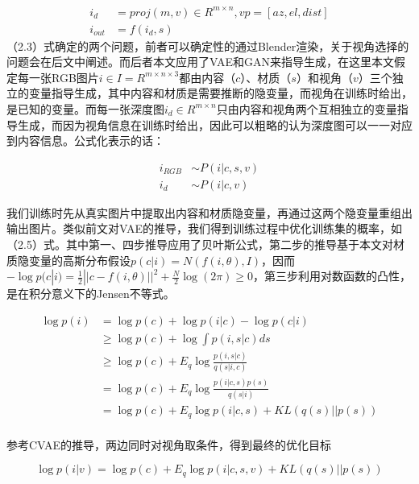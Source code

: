 \documentclass[UTF8,openany,AutoFakeBold,AutoFakeSlant,cs4size]{ctexbook}
\begin{document}
\begin{equation}
	\begin{aligned}
		i_{d} &= proj(m, v) \in R^{m \times n}, vp = [az, el, dist] \\
		i_{out} &= f(i_{d}, s)
	\end{aligned}
\end{equation}
（2.3）式确定的两个问题，前者可以确定性的通过Blender渲染，关于视角选择的问题会在后文中阐述。而后者本文应用了VAE和GAN来指导生成，在这里本文假定每一张RGB图片$i \in I = R^{m \times n \times 3}$都由内容（$c$）、材质（$s$）和视角（$v$）三个独立的变量指导生成，其中内容和材质是需要推断的隐变量，而视角在训练时给出，是已知的变量。而每一张深度图$i_{d} \in R^{m \times n}$只由内容和视角两个互相独立的变量指导生成，而因为视角信息在训练时给出，因此可以粗略的认为深度图可以一一对应到内容信息。公式化表示的话：

\begin{equation}
	\begin{aligned}
		i_{RGB} &\sim P(i | c, s, v) \\ i_{d} &\sim P(i | c, v)
	\end{aligned}
\end{equation}

我们训练时先从真实图片中提取出内容和材质隐变量，再通过这两个隐变量重组出输出图片。类似前文对VAE的推导，我们得到训练过程中优化训练集的概率，如（2.5）式。其中第一、四步推导应用了贝叶斯公式，第二步的推导基于本文对材质隐变量的高斯分布假设$p(c | i) = N(f(i, \theta), I)$，因而$-\log p(c | i) = \frac{1}{2}||c - f(i, \theta) ||^2 + \frac{N}{2}\log (2\pi) \geq 0$，第三步利用对数函数的凸性，是在积分意义下的Jensen不等式。

\begin{equation}
	\begin{aligned}
		\log p(i) &= \log p(c) + \log p(i | c) - \log p(c | i) \\
		&\geq \log p(c) + \log  \int p(i, s | c) ds \\
		&\geq \log p(c) + E_{q} \log \frac{p(i, s | c)}{q(s | i, c)} \\
		&= \log p(c) + E_{q} \log \frac{p(i | c, s)p(s)}{q(s | i)} \\
		&= \log p(c) + E_{q} \log p(i | c, s) + KL(q(s) || p(s)) \\
	\end{aligned}
\end{equation}

参考CVAE的推导，两边同时对视角取条件，得到最终的优化目标

\begin{equation}
	\log p(i | v)= \log p(c) + E_{q} \log p(i | c, s, v) + KL(q(s) || p(s))
\end{equation}
\end{document}
